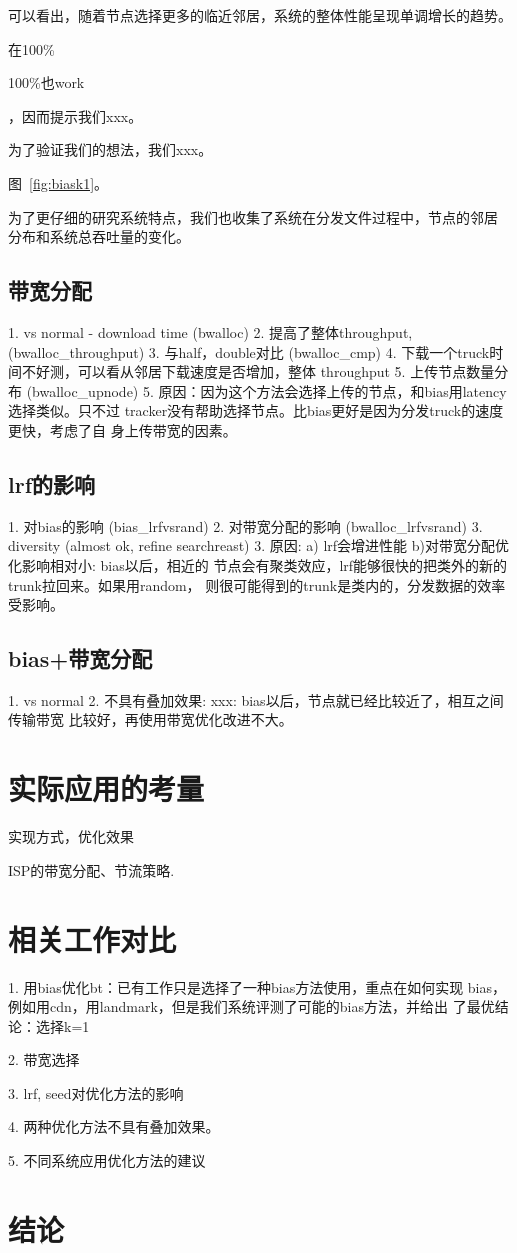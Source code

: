 可以看出，随着节点选择更多的临近邻居，系统的整体性能呈现单调增长的趋势。



在100\%


100\%也work

，因而提示我们xxx。

为了验证我们的想法，我们xxx。

图~\ref{fig:biask1}。

为了更仔细的研究系统特点，我们也收集了系统在分发文件过程中，节点的邻居
分布和系统总吞吐量的变化。


\subsection{带宽分配}
1. vs normal - download time (bwalloc)
2. 提高了整体throughput, (bwalloc\_throughput)
3. 与half，double对比 (bwalloc\_cmp)
4. 下载一个truck时间不好测，可以看从邻居下载速度是否增加，整体
throughput
5. 上传节点数量分布 (bwalloc\_upnode)
5. 原因：因为这个方法会选择上传的节点，和bias用latency选择类似。只不过
tracker没有帮助选择节点。比bias更好是因为分发truck的速度更快，考虑了自
身上传带宽的因素。

\subsection{lrf的影响}
1. 对bias的影响 (bias\_lrfvsrand)
2. 对带宽分配的影响 (bwalloc\_lrfvsrand)
3. diversity (almost ok, refine searchreast)
3. 原因: a) lrf会增进性能 b)对带宽分配优化影响相对小: bias以后，相近的
节点会有聚类效应，lrf能够很快的把类外的新的trunk拉回来。如果用random，
则很可能得到的trunk是类内的，分发数据的效率受影响。


\subsection{bias+带宽分配}
1. vs normal
2. 不具有叠加效果: xxx: bias以后，节点就已经比较近了，相互之间传输带宽
比较好，再使用带宽优化改进不大。

\section{实际应用的考量}
实现方式，优化效果

ISP的带宽分配、节流策略.

\section{相关工作对比}

1. 用bias优化bt：已有工作只是选择了一种bias方法使用，重点在如何实现
bias，例如用cdn，用landmark，但是我们系统评测了可能的bias方法，并给出
了最优结论：选择k=1

2. 带宽选择

3. lrf, seed对优化方法的影响

4. 两种优化方法不具有叠加效果。

5. 不同系统应用优化方法的建议

\section{结论}

